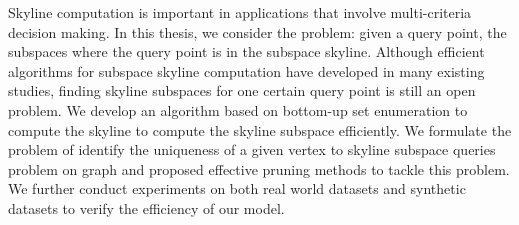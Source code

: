 
%
%


Skyline computation is important in applications that involve multi-criteria decision making. In this thesis, we consider the problem: given a query point, the subspaces where the query point is in the subspace skyline. Although efficient algorithms for subspace skyline computation have developed in many existing studies, finding skyline subspaces for one certain query point is still an open problem. We develop an algorithm based on bottom-up set enumeration to compute the skyline to compute the skyline subspace efficiently. We formulate the problem of identify the uniqueness of a given vertex to skyline subspace queries problem on graph and proposed effective pruning methods to tackle this problem. We further conduct experiments on both real world datasets and synthetic datasets to verify the efficiency of our model.










